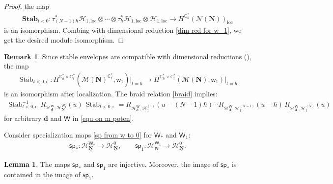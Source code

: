 \documentclass[10pt]{amsart}
\theoremstyle{definition}
\newtheorem{Lemma}[Theorem]{Lemma}
\newtheorem{Remark}[Theorem]{Remark}
\numberwithin{equation}{section}
\newcommand{\bC}{\mathbb{C}}
\newcommand{\bd}{\mathbf{d}}
\newcommand{\cH}{\mathcal{H}}
\newcommand{\cM}{\mathcal{M}}
\newcommand{\cN}{\mathcal{N}}
\newcommand{\loc}{\mathrm{loc}}
\newcommand{\sW}{\mathsf{W}}
\newcommand{\sw}{\mathsf{w}}
\newcommand{\Stab}{\operatorname{Stab}}
\begin{document}
\begin{proof}
the map 
\begin{align*}
    \mathbf{Stab}_{t<0}\colon \tau^*_{(N-1)\hbar}\cH_{1,\loc}\otimes \cdots \otimes \tau^*_{\hbar}\cH_{1,\loc}\otimes \cH_{1,\loc}\to H^{\bC^*_\hbar}(\cN(\mathbf N))_\loc
\end{align*}
is an isomorphism. Combing with dimensional reduction \eqref{dim red for w_1}, we get the desired module isomorphism. 
\end{proof}

\begin{Remark}
Since stable envelopes are compatible with dimensional reductions (\cite[Thm.~6.10]{COZZ}), the map
\begin{align*}
    \Stab_{t<0,\epsilon}\colon H^{\bC^*_\hbar\times \bC^*_t}(\cM(\mathbf N)^{\bC^*_t},\sw_1)\big|_{t=\hbar}\to H^{\bC^*_\hbar\times \bC^*_t}(\cM(\mathbf N),\sw_1)\big|_{t=\hbar}
\end{align*}
is an isomorphism after localization. The braid relation \eqref{braid} implies:
\begin{align*}
    \Stab_{t<0,\epsilon}^{-1}\,R_{\mathcal H^{\sW}_{\underline{\bd}},\mathcal H^{\sW_1}_{\underline{\mathbf N}}}(u)\,\Stab_{t<0,\epsilon}=R_{\mathcal H^{\sW}_{\underline{\bd}},\mathcal H_1^{(1)}}(u-(N-1)\hbar)\cdots  R_{\mathcal H^{\sW}_{\underline{\bd}},\mathcal H_1^{(N-1)}}(u-\hbar)\,R_{\mathcal H^{\sW}_{\underline{\bd}},\mathcal H_1^{(N)}}(u)
\end{align*}
for arbitrary $\underline{\bd}$ and $\sW$ in \eqref{equ on m poten}.
\end{Remark}

Consider specialization maps \eqref{sp from w to 0} for $\sW_*$ and $\sW_1$:
\begin{align*}
    \mathsf{sp}_*\colon \mathcal H_{\underline{\mathbf N}}^{\sW_*}\to \mathcal H_{\underline{\mathbf N}}^{0},\qquad \mathsf{sp}_1\colon \mathcal H_{\underline{\mathbf N}}^{\sW_1}\to \mathcal H_{\underline{\mathbf N}}^{0}.
\end{align*}
\begin{Lemma}\label{lem sp* and sp1 inj}
The maps $\mathsf{sp}_*$ and $\mathsf{sp}_1$ are injective. Moreover, the image of $\mathsf{sp}_*$ is contained in the image of $\mathsf{sp}_1$.
\end{Lemma}
\end{document}
